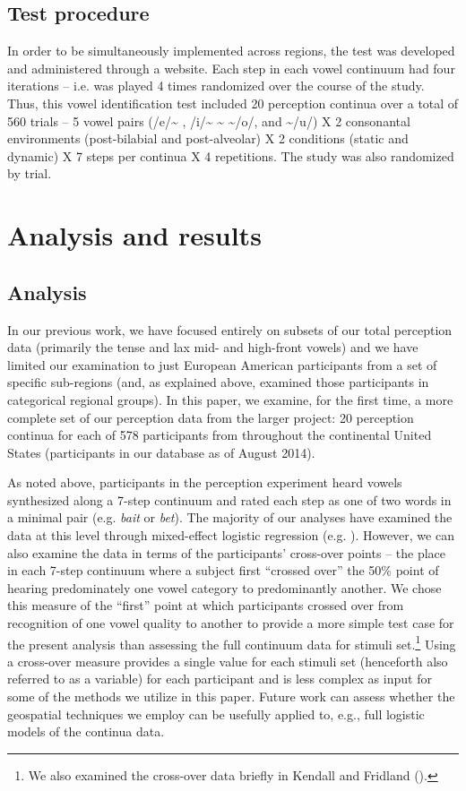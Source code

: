 \documentclass[output=paper]{LSP/langsci}
\begin{document}
\subsection{Test procedure}
In order to be simultaneously implemented across regions, the test was developed and administered through a website. Each step in each vowel continuum had four iterations – i.e. was played 4 times randomized over the course of the study. Thus, this vowel identification test included 20 perception continua over a total of 560 trials – 5 vowel pairs (/e/\~{}
, /i/\~{}
\~{}
\~{}/o/, and 
\~{}/u/) X 2 consonantal environments (post-bilabial and post-alveolar) X 2 conditions (static and dynamic) X 7 steps per continua X 4 repetitions. The study was also randomized by trial. 

\section{Analysis and results}

\subsection{ Analysis}
In our previous work, we have focused entirely on subsets of our total perception data (primarily the tense and lax mid- and high-front vowels) and we have limited our examination to just European American participants from a set of specific sub-regions (and, as explained above, examined those participants in categorical regional groups). In this paper, we examine, for the first time, a more complete set of our perception data from the larger project: 20 perception continua for each of 578 participants from throughout the continental United States (participants in our database as of August 2014). 

As noted above, participants in the perception experiment heard vowels synthesized along a 7-step continuum and rated each step as one of two words in a minimal pair (e.g. \textit{bait} or \textit{bet}). The majority of our analyses have examined the data at this level through mixed-effect logistic regression (e.g. \citealt{kendall_variation_2012}). However, we can also examine the data in terms of the participants’ cross-over points – the place in each 7-step continuum where a subject first “crossed over” the 50\% point of hearing predominately one vowel category to predominantly another. We chose this measure of the “first” point at which participants crossed over from recognition of one vowel quality to another to provide a more simple test case for the present analysis than assessing the full continuum data for stimuli set.\footnote{We also examined the cross-over data briefly in Kendall and Fridland (\citeyear{kendall_mapping_2010,kendall_variation_2012}).} Using a cross-over measure provides a single value for each stimuli set (henceforth also referred to as a variable) for each participant and is less complex as input for some of the methods we utilize in this paper. Future work can assess whether the geospatial techniques we employ can be usefully applied to, e.g., full logistic models of the continua data.
\end{document}
